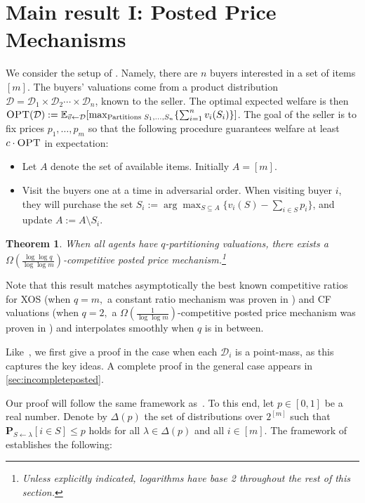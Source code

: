 \documentclass[11pt]{article}%
\newtheorem{theorem}{Theorem}
\numberwithin{theorem}{subsection}
\newcommand{\prob}{\mathbf{P}}
\begin{document}
\section{Main result I: Posted Price Mechanisms}\label{section:postedprices}
We consider the setup of \cite{FeldmanGL15}. Namely, there are $n$ buyers interested in a set of items $[m].$ The buyers' valuations come from a product distribution $\mathcal{D} = \mathcal{D}_1\times \mathcal{D}_2\cdots\times\mathcal{D}_n$, known to the seller. The optimal expected welfare is then $\textsc{OPT}(\mathcal{D}):=\mathbb{E}_{\vec{v} \leftarrow \mathcal{D}}[\max_{\text{Partitions } S_1,\ldots, S_n}\{\sum_{i=1}^n v_i(S_i)\}]$. The goal of the seller is to fix prices $p_1,\ldots, p_m$ so that the following procedure guarantees welfare at least $c\cdot \textsc{OPT}$ in expectation:
\begin{itemize}
\item Let $A$ denote the set of available items. Initially $A = [m]$.
\item Visit the buyers one at a time in adversarial order. When visiting buyer $i$, they will purchase the set $S_i:=\arg\max_{S \subseteq A}\{v_i(S) - \sum_{i \in S} p_i\}$, and update $A:=A \setminus S_i$. 
\end{itemize}

\begin{theorem}
\label{thm:postedpriceqpart}
    When all agents have $q$-partitioning valuations, there exists a
    $\Omega(\frac{\log \log q}{\log \log m})$-competitive
    posted price mechanism.\footnote{Unless explicitly indicated, logarithms have base 2 throughout the rest of this section.}
\end{theorem}

Note that this result matches asymptotically the best known competitive ratios for XOS (when $q = m,$ a constant ratio mechanism was proven in \cite{FeldmanGL15}) and CF valuations (when $q = 2,$ a $\Omega(\frac{1}{\log \log m})$-competitive posted price mechanism was proven in \cite{DuttingKL20}) and interpolates smoothly when $q$ is in between.

Like~\cite{DuttingKL20}, we first give a proof in the case when each $\mathcal{D}_i$ is a point-mass, as this captures the key ideas. A complete proof in the general case appears in \cref{sec:incompleteposted}.

Our proof will follow the same framework as~\cite{DuttingKL20}. To this end, let $p \in [0,1]$ be a real number. Denote by $\Delta(p)$ the set of distributions over $2^{[m]}$ such that $\prob_{S\leftarrow \lambda}[i \in S]\le p$ holds for all $\lambda \in \Delta(p)$ and all 
$i \in [m]$. The framework of~\cite{DuttingKL20} establishes the following:
\end{document}

